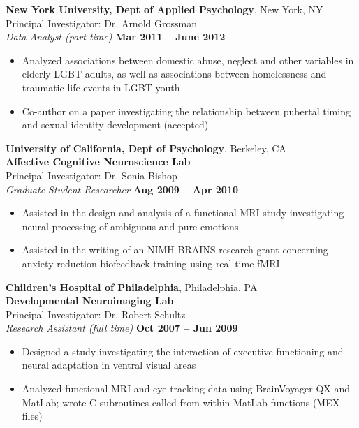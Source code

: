 \documentclass[margin]{res}
\begin{document}
\begin{resume}
 {\bf New York University, Dept of Applied Psychology}, New York, NY\\
 Principal Investigator: Dr. Arnold Grossman\\
 {\it Data Analyst (part-time)} \hfill {\bf Mar 2011 -- June 2012}
 \begin{itemize} \itemsep -2pt
  \item Analyzed associations between domestic abuse, neglect and
        other variables in elderly LGBT adults, as well as associations
        between homelessness and traumatic life events in LGBT youth
  \item Co-author on a paper investigating the relationship between
        pubertal timing and sexual identity development (accepted)
 \end{itemize}

 {\bf University of California, Dept of Psychology}, Berkeley, CA\\
 {\bf Affective Cognitive Neuroscience Lab}\\
 Principal Investigator: Dr. Sonia Bishop\\
 {\it Graduate Student Researcher} \hfill {\bf Aug 2009 -- Apr 2010}
 \begin{itemize} \itemsep -2pt
  \item Assisted in the design and analysis of a functional MRI study 
        investigating neural processing of ambiguous and pure emotions 
  \item Assisted in the writing of an NIMH BRAINS research grant concerning
        anxiety reduction biofeedback training using real-time fMRI
 \end{itemize}

 {\bf Children's Hospital of Philadelphia}, Philadelphia, PA\\
 {\bf Developmental Neuroimaging Lab}\\
 Principal Investigator: Dr. Robert Schultz\\
 {\it Research Assistant (full time)} \hfill {\bf Oct 2007 -- Jun 2009}
 \begin{itemize} \itemsep -2pt
  \item Designed a study investigating the interaction of executive 
        functioning and neural adaptation in ventral visual areas
  \item Analyzed functional MRI and eye-tracking data using 
        BrainVoyager QX and MatLab; wrote C subroutines called from 
        within MatLab functions (MEX files)
 \end{itemize}


\end{resume}
\end{document}
